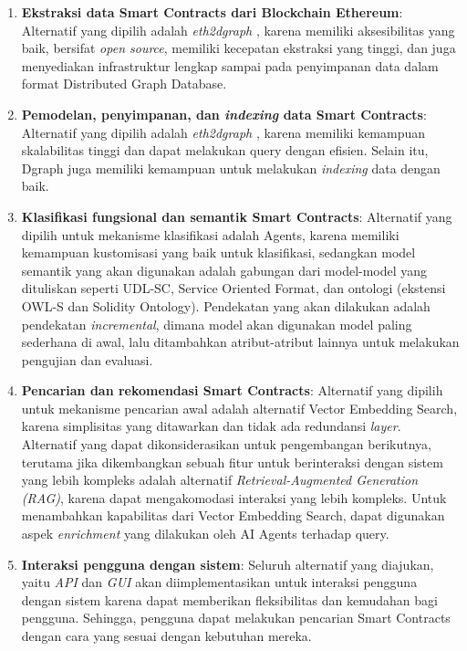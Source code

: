 \begin{enumerate}
    \item \textbf{Ekstraksi data Smart Contracts dari Blockchain Ethereum}: Alternatif yang dipilih adalah \textit{eth2dgraph} \parencite{aimar2023extraction}, karena memiliki aksesibilitas yang baik, bersifat \textit{open source}, memiliki kecepatan ekstraksi yang tinggi, dan juga menyediakan infrastruktur lengkap sampai pada penyimpanan data dalam format Distributed Graph Database.
    \item \textbf{Pemodelan, penyimpanan, dan \textit{indexing} data Smart Contracts}: Alternatif yang dipilih adalah \textit{eth2dgraph} \parencite{aimar2023extraction}, karena memiliki kemampuan skalabilitas tinggi dan dapat melakukan query dengan efisien. Selain itu, Dgraph juga memiliki kemampuan untuk melakukan \textit{indexing} data dengan baik.
    \item \textbf{Klasifikasi fungsional dan semantik Smart Contracts}: Alternatif yang dipilih untuk mekanisme klasifikasi adalah Agents, karena memiliki kemampuan kustomisasi yang baik untuk klasifikasi, sedangkan model semantik yang akan digunakan adalah gabungan dari model-model yang dituliskan seperti UDL-SC, Service Oriented Format, dan ontologi (ekstensi OWL-S dan Solidity Ontology). Pendekatan yang akan dilakukan adalah pendekatan \textit{incremental}, dimana model akan digunakan model paling sederhana di awal, lalu ditambahkan atribut-atribut lainnya untuk melakukan pengujian dan evaluasi.
    \item \textbf{Pencarian dan rekomendasi Smart Contracts}: Alternatif yang dipilih untuk mekanisme pencarian awal adalah alternatif Vector Embedding Search, karena simplisitas yang ditawarkan dan tidak ada redundansi \textit{layer}. Alternatif yang dapat dikonsiderasikan untuk pengembangan berikutnya, terutama jika dikembangkan sebuah fitur untuk berinteraksi dengan sistem yang lebih kompleks adalah alternatif \textit{Retrieval-Augmented Generation (RAG)}, karena dapat mengakomodasi interaksi yang lebih kompleks. Untuk menambahkan kapabilitas dari Vector Embedding Search, dapat digunakan aspek \textit{enrichment} yang dilakukan oleh AI Agents terhadap query.
    \item \textbf{Interaksi pengguna dengan sistem}: Seluruh alternatif yang diajukan, yaitu \textit{API} dan \textit{GUI} akan diimplementasikan untuk interaksi pengguna dengan sistem karena dapat memberikan fleksibilitas dan kemudahan bagi pengguna. Sehingga, pengguna dapat melakukan pencarian Smart Contracts dengan cara yang sesuai dengan kebutuhan mereka.
\end{enumerate}
